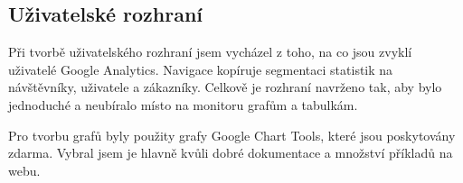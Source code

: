 \documentclass[bc,male,java,dept456]{diploma}						%
\begin{document}

\clearpage
\subsection{Uživatelské rozhraní}

Při tvorbě uživatelského rozhraní jsem vycházel z toho, na co jsou zvyklí uživatelé Google Analytics. Navigace kopíruje segmentaci statistik na návštěvníky, uživatele a zákazníky. Celkově je rozhraní navrženo tak, aby bylo jednoduché a neubíralo místo na monitoru grafům a tabulkám.

Pro tvorbu grafů byly použity grafy Google Chart Tools\cite{chart_tools}, které jsou poskytovány zdarma. Vybral jsem je hlavně kvůli dobré dokumentace a množství příkladů na webu.
\end{document}

